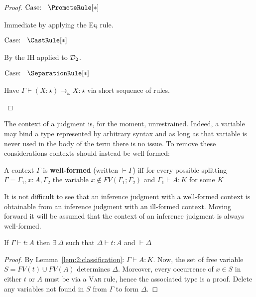 \begin{proof}
    $\text{Case: }\begin{array}{c} \PromoteRule[*] \end{array}$
    \begin{proofcase}
        Immediate by applying the \textsc{Eq} rule.
    \end{proofcase}

    $\text{Case: }\begin{array}{c} \CastRule[*] \end{array}$
    \begin{proofcase}
        By the IH applied to $\mathcal{D}_{2}$.
    \end{proofcase}

    $\text{Case: }\begin{array}{c} \SeparationRule[*] \end{array}$
    \begin{proofcase}
        Have $\Gamma \vdash (X : \star) \to_\omega X : \star$ via short sequence of rules.
    \end{proofcase}
\end{proof}

The context of a judgment is, for the moment, unrestrained.
Indeed, a variable may bind a type represented by arbitrary syntax and as long as that variable is never used in the body of the term there is no issue.
To remove these considerations contexts should instead be well-formed:
\begin{definition}
    A context $\Gamma$ is \textbf{well-formed} (written $\vdash \Gamma$) iff for every possible splitting $\Gamma = \Gamma_1, x : A, \Gamma_2$ the variable $x \notin FV(\Gamma_1;\Gamma_2)$ and $\Gamma_1 \vdash A : K$ for some $K$
\end{definition}
It is not difficult to see that an inference judgment with a well-formed context is obtainable from an inference judgment with an ill-formed context.
Moving forward it will be assumed that the context of an inference judgment is always well-formed.
\begin{lemma}
    If $\Gamma \vdash t : A$ then $\exists\ \Delta$ such that $\Delta \vdash t : A$ and $\vdash \Delta$
\end{lemma}
\begin{proof}
    By Lemma~\ref{lem:2:classification}: $\Gamma \vdash A : K$.
    Now, the set of free variable $S = FV(t) \cup FV(A)$ determines $\Delta$.
    Moreover, every occurrence of $x \in S$ in either $t$ or $A$ must be via a \textsc{Var} rule, hence the associated type is a proof.
    Delete any variables not found in $S$ from $\Gamma$ to form $\Delta$.
\end{proof}
